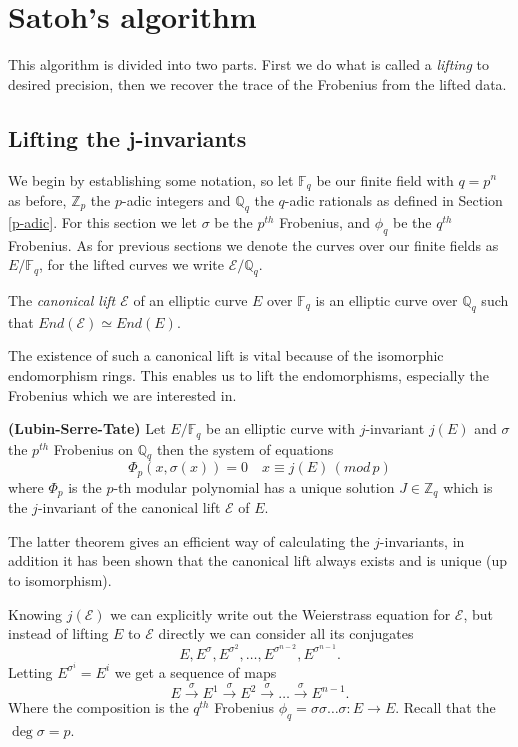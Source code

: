 \section{Satoh's algorithm} \label{satoh}
This algorithm is divided into two parts. First we do what is called a \emph{lifting} to desired
precision, then we recover the trace of the Frobenius from the lifted data.

\subsection{Lifting the j-invariants}
We begin by establishing some notation, so let $\mathbb{F}_q$ be our finite field with $q=p^n$ as before,
$\mathbb{Z}_p$ the $p$-adic integers and $\mathbb{Q}_q$ the $q$-adic rationals as defined in Section \ref{p-adic}.
For this section we let $\sigma$ be the $p^{th}$ Frobenius, and $\phi_q$ be the $q^{th}$ Frobenius.
As for previous sections we denote the curves over our finite fields as $E/\mathbb{F}_q$,
for the lifted curves we write $\mathscr{E}/\mathbb{Q}_q$.

\begin{mydef}
 The \emph{canonical lift $\mathscr{E}$} of an elliptic curve $E$ over $\mathbb{F}_q$ is
an elliptic curve over $\mathbb{Q}_q$ such that $End(\mathscr{E}) \simeq End(E)$.
\end{mydef}

The existence of such a canonical lift is vital because of the isomorphic endomorphism rings. This
enables us to lift the endomorphisms, especially the Frobenius which we are interested in.

\begin{thm}
 \textbf{(Lubin-Serre-Tate)} Let $E/\mathbb{F}_q$ be an elliptic curve with $j$-invariant $j(E)$ and
$\sigma$ the $p^{th}$ Frobenius on $\mathbb{Q}_q$ then the system of equations
$$ \Phi_p(x, \sigma(x)) = 0 \quad x \equiv j(E) \, (mod\, p)$$
where $\Phi_p$ is the $p$-th modular polynomial has a unique solution $J \in \mathbb{Z}_q$ 
which is the $j$-invariant of the canonical lift $\mathscr{E}$ of $E$.
\end{thm}
The latter theorem gives an efficient way of calculating the $j$-invariants, in addition it has
been shown \cite{Deuring} that the canonical lift always exists and is unique (up to isomorphism).

Knowing $j(\mathscr{E})$ we can explicitly write out the Weierstrass equation for $\mathscr{E}$, but
instead of lifting $E$ to $\mathscr{E}$ directly we can consider all its conjugates
$$E, E^\sigma, E^{\sigma^2}, \ldots, E^{\sigma^{n-2}}, E^{\sigma^{n-1}}. $$
Letting $E^{\sigma^i} = E^i $ we get a sequence of maps
$$ E \overset{\sigma}{\rightarrow} E^1 \overset{\sigma}{\rightarrow} E^2 \overset{\sigma}{\rightarrow}
\ldots \overset{\sigma}{\rightarrow} E^{n-1}. $$
Where the composition is the $q^{th}$ Frobenius $\phi_q = \sigma \sigma \ldots \sigma: E \rightarrow E$.
Recall that the $\deg \sigma = p$.

